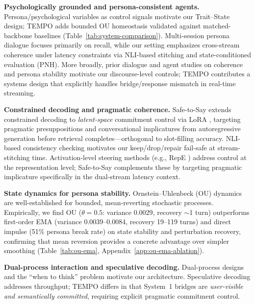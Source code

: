 \documentclass[11pt]{article}
\begin{document}
\textbf{Psychologically grounded and persona-consistent agents.}
Persona/psychological variables as control signals \cite{park2023generative,li2023camel,zhang2025personaagent,zeng2025dynamicpersonality,shanahan2023roleplay} motivate our Trait--State design; TEMPO adds bounded OU homeostasis validated against matched-backbone baselines (Table~\ref{tab:system-comparison}). Multi-session persona dialogue \cite{xu2022msc,packer2023memgpt} focuses primarily on recall, while our setting emphasizes cross-stream coherence under latency constraints via NLI-based stitching and state-conditioned evaluation (PNH).
More broadly, prior dialogue and agent studies on coherence and persona stability motivate our discourse-level controls; TEMPO contributes a systems design that explicitly handles bridge/response mismatch in real-time streaming.

\textbf{Constrained decoding and pragmatic coherence.}
Safe-to-Say extends constrained decoding to \textit{latent-space} commitment control via LoRA \cite{hu2021lora}, targeting pragmatic presuppositions and conversational implicatures from autoregressive generation before retrieval completes---orthogonal to slot-filling accuracy. NLI-based consistency checking \cite{platnick2025idrag} motivates our keep/drop/repair fail-safe at stream-stitching time. Activation-level steering methods (e.g., RepE \cite{zou2023representation}) address control at the representation level; Safe-to-Say complements these by targeting pragmatic implicature specifically in the dual-stream latency context.

\textbf{State dynamics for persona stability.}
Ornstein--Uhlenbeck (OU) dynamics are well-established for bounded, mean-reverting stochastic processes. Empirically, we find OU ($\theta{=}0.5$: variance 0.0029, recovery $\sim$1 turn) outperforms first-order EMA (variance 0.0039--0.0084, recovery 19--119 turns) and direct impulse (51\% persona break rate) on state stability and perturbation recovery, confirming that mean reversion provides a concrete advantage over simpler smoothing (Table~\ref{tab:ou-ema}, Appendix~\ref{app:ou-ema-ablation}).

\textbf{Dual-process interaction and speculative decoding.}
Dual-process designs \cite{zhang2025dptagent,liu2023hierarchicalagent,liu2024coordination,lin2024estuary} and the ``when to think'' problem \cite{pandian2025snapout} motivate our architecture. Speculative decoding \cite{leviathan2023fast} addresses throughput; TEMPO differs in that System~1 bridges are \emph{user-visible and semantically committed}, requiring explicit pragmatic commitment control.
\end{document}
